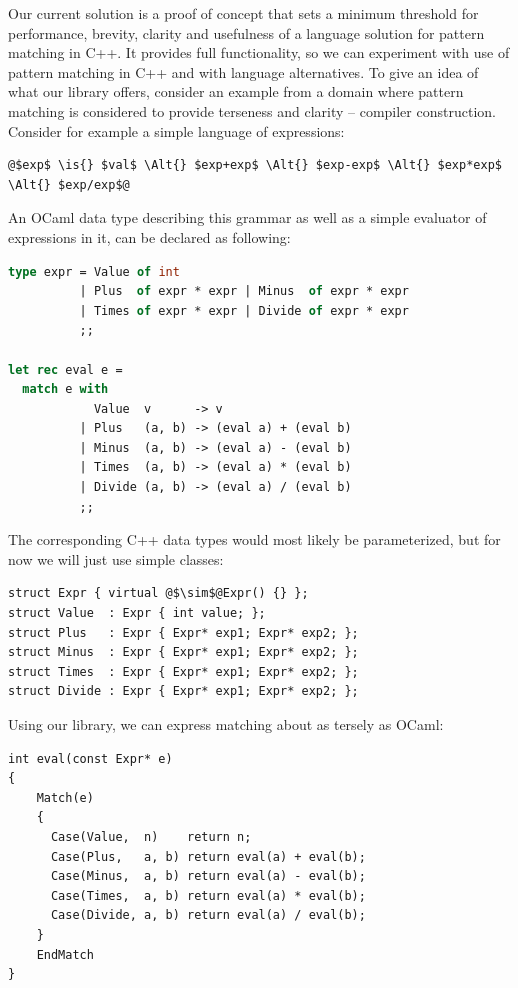 \documentclass[preprint]{sigplanconf}
\newcommand{\Alt}{\ensuremath{|}}
\newcommand{\is}{$::=$}
\begin{document}
Our current solution is a proof of concept that sets a minimum threshold for 
performance, brevity, clarity and usefulness of a language solution for pattern 
matching in C++. It provides full functionality, so we can experiment with use 
of pattern matching in C++ and with language alternatives. To give an idea of 
what our library offers, consider an example from a domain where pattern matching 
is considered to provide terseness and clarity -- compiler construction. 
Consider for example a simple language of expressions:

\begin{lstlisting}
@$exp$ \is{} $val$ \Alt{} $exp+exp$ \Alt{} $exp-exp$ \Alt{} $exp*exp$ \Alt{} $exp/exp$@
\end{lstlisting}

\noindent
An OCaml data type describing this grammar as well as a simple evaluator of expressions 
in it, can be declared as following:

\begin{lstlisting}[language=Caml,keepspaces,columns=flexible]
type expr = Value of int 
          | Plus  of expr * expr | Minus  of expr * expr 
          | Times of expr * expr | Divide of expr * expr
          ;;

let rec eval e =
  match e with
            Value  v      -> v
          | Plus   (a, b) -> (eval a) + (eval b)
          | Minus  (a, b) -> (eval a) - (eval b)
          | Times  (a, b) -> (eval a) * (eval b)
          | Divide (a, b) -> (eval a) / (eval b)
          ;;
\end{lstlisting}

\noindent
The corresponding C++ data types would most likely be parameterized, but for
now we will just use simple classes:

\begin{lstlisting}[keepspaces,columns=flexible]
struct Expr { virtual @$\sim$@Expr() {} };
struct Value  : Expr { int value; };
struct Plus   : Expr { Expr* exp1; Expr* exp2; };
struct Minus  : Expr { Expr* exp1; Expr* exp2; };
struct Times  : Expr { Expr* exp1; Expr* exp2; };
struct Divide : Expr { Expr* exp1; Expr* exp2; };
\end{lstlisting}

\noindent
Using our library, we can express matching about as tersely as OCaml:

\begin{lstlisting}[keepspaces,columns=flexible]
int eval(const Expr* e)
{
    Match(e)
    {
      Case(Value,  n)    return n;
      Case(Plus,   a, b) return eval(a) + eval(b);
      Case(Minus,  a, b) return eval(a) - eval(b);
      Case(Times,  a, b) return eval(a) * eval(b);
      Case(Divide, a, b) return eval(a) / eval(b);
    }
    EndMatch
}
\end{lstlisting}
\end{document}
